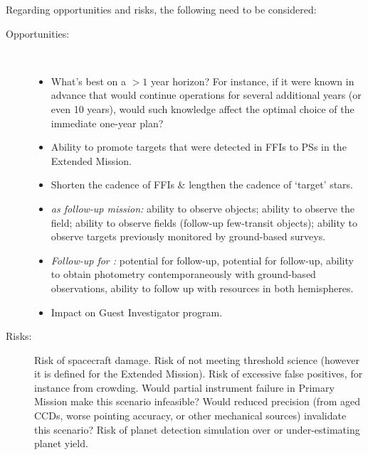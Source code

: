 Regarding opportunities and risks, the following need to be considered:
\begin{description}
	\item[Opportunities:]\ 
	\begin{itemize}
	\item What's best on a $>1$ year horizon? For instance, if it were known in advance
	that \tess would continue operations for several additional years (or even 10
	years), would such knowledge affect the optimal choice of the immediate
	one-year plan?
		\item Ability to promote targets that were detected in FFIs to PSs in the Extended Mission.
		\item Shorten the cadence of FFIs \& lengthen the cadence of `target' stars.
		\item \textit{\tess as follow-up mission:} ability to
                  observe \corot objects; ability to observe the \kepler
                  field;
                  ability to observe \ktwo fields (follow-up \ktwo
                  few-transit objects); ability to observe targets
                  previously monitored by ground-based surveys.
		\item \textit{Follow-up for \tess\!:} 
		potential for \jwst follow-up, 
		potential for \cheops follow-up,
		ability to obtain \tess photometry contemporaneously with ground-based observations,
		ability to follow up with resources in both hemispheres.
		\item Impact on Guest Investigator program.
	\end{itemize}
	
	\item[Risks:] 
	Risk of spacecraft damage. 
	Risk of not meeting threshold science (however it is defined for the Extended Mission).
	Risk of excessive false positives, for instance from crowding. 
	Would partial instrument failure in Primary Mission make this scenario infeasible? 
	Would reduced precision (from aged CCDs, worse pointing accuracy, or other mechanical sources) invalidate this scenario? 
	Risk of planet detection simulation over or under-estimating planet yield.
\end{description}
